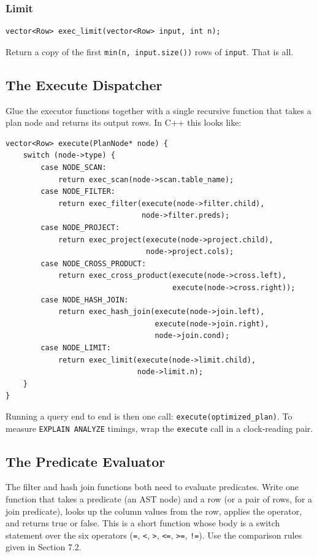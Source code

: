 \documentclass[11pt,a4paper]{article}
\begin{document}
\subsubsection{Limit}
\begin{codebox}
\begin{lstlisting}
vector<Row> exec_limit(vector<Row> input, int n);
\end{lstlisting}
\end{codebox}
Return a copy of the first \texttt{min(n, input.size())} rows of \texttt{input}. That is all.

\subsection{The Execute Dispatcher}
Glue the executor functions together with a single recursive function that takes a plan node and returns its output rows. In C++ this looks like:

\begin{codebox}
\begin{lstlisting}
vector<Row> execute(PlanNode* node) {
    switch (node->type) {
        case NODE_SCAN:
            return exec_scan(node->scan.table_name);
        case NODE_FILTER:
            return exec_filter(execute(node->filter.child),
                               node->filter.preds);
        case NODE_PROJECT:
            return exec_project(execute(node->project.child),
                                node->project.cols);
        case NODE_CROSS_PRODUCT:
            return exec_cross_product(execute(node->cross.left),
                                      execute(node->cross.right));
        case NODE_HASH_JOIN:
            return exec_hash_join(execute(node->join.left),
                                  execute(node->join.right),
                                  node->join.cond);
        case NODE_LIMIT:
            return exec_limit(execute(node->limit.child),
                              node->limit.n);
    }
}
\end{lstlisting}
\end{codebox}

Running a query end to end is then one call: \texttt{execute(optimized\_plan)}. To measure \texttt{EXPLAIN ANALYZE} timings, wrap the \texttt{execute} call in a clock-reading pair.

\subsection{The Predicate Evaluator}
The filter and hash join functions both need to evaluate predicates. Write one function that takes a predicate (an AST node) and a row (or a pair of rows, for a join predicate), looks up the column values from the row, applies the operator, and returns true or false. This is a short function whose body is a switch statement over the six operators (\texttt{=}, \texttt{<}, \texttt{>}, \texttt{<=}, \texttt{>=}, \texttt{!=}). Use the comparison rules given in Section 7.2.
\end{document}
